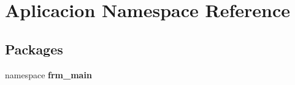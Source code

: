 \section{\-Aplicacion \-Namespace \-Reference}
\label{namespace_aplicacion}
\subsection*{\-Packages}
\begin{DoxyCompactItemize}
\item 
namespace {\bf frm\-\_\-main}
\end{DoxyCompactItemize}
